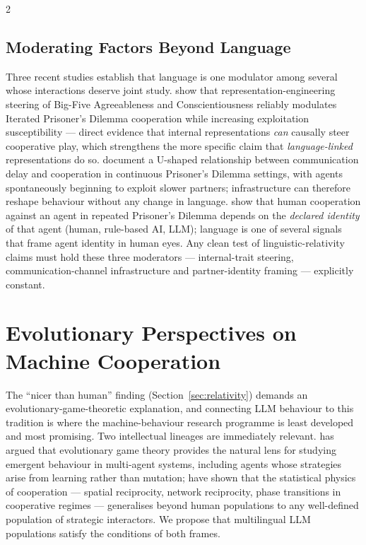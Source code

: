 \documentclass[openacc]{rsproca_new}
\begin{document}
\begin{multicols}{2}
\subsection{Moderating Factors Beyond Language}\label{sec:moderators}

Three recent studies establish that language is one modulator among several whose interactions deserve joint study. \citeauthor{ong2025personalitysteering} \cite{ong2025personalitysteering} show that representation-engineering steering of Big-Five Agreeableness and Conscientiousness reliably modulates Iterated Prisoner's Dilemma cooperation while increasing exploitation susceptibility --- direct evidence that internal representations \emph{can} causally steer cooperative play, which strengthens the more specific claim that \emph{language-linked} representations do so. \citeauthor{nishimoto2026commdelay} \cite{nishimoto2026commdelay} document a U-shaped relationship between communication delay and cooperation in continuous Prisoner's Dilemma settings, with agents spontaneously beginning to exploit slower partners; infrastructure can therefore reshape behaviour without any change in language. \citeauthor{jiang2025trustcollides} \cite{jiang2025trustcollides} show that human cooperation against an agent in repeated Prisoner's Dilemma depends on the \emph{declared identity} of that agent (human, rule-based AI, LLM); language is one of several signals that frame agent identity in human eyes. Any clean test of linguistic-relativity claims must hold these three moderators --- internal-trait steering, communication-channel infrastructure and partner-identity framing --- explicitly constant.

\section{Evolutionary Perspectives on Machine Cooperation}
\label{sec:evolution}

The ``nicer than human'' finding (Section~\ref{sec:relativity}) demands an evolutionary-game-theoretic explanation, and connecting LLM behaviour to this tradition is where the machine-behaviour research programme is least developed and most promising. Two intellectual lineages are immediately relevant. \citeauthor{han2022emergent} \cite{han2022emergent} has argued that evolutionary game theory provides the natural lens for studying emergent behaviour in multi-agent systems, including agents whose strategies arise from learning rather than mutation; \citeauthor{perc2017statistical} \cite{perc2017statistical} have shown that the statistical physics of cooperation --- spatial reciprocity, network reciprocity, phase transitions in cooperative regimes --- generalises beyond human populations to any well-defined population of strategic interactors. We propose that multilingual LLM populations satisfy the conditions of both frames.


\end{multicols}
\end{document}
